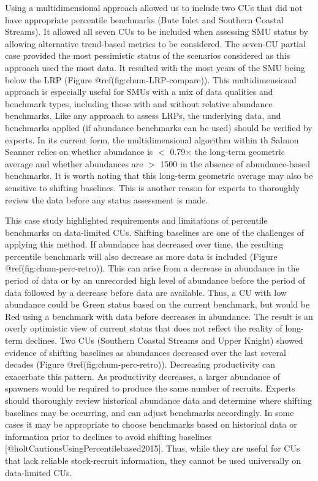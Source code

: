 \documentclass[
]{article}
\begin{document}
Using a multidimensional approach allowed us to include two CUs that did
not have appropriate percentile benchmarks (Bute Inlet and Southern
Coastal Streams). It allowed all seven CUs to be included when assessing
SMU status by allowing alternative trend-based metrics to be considered.
The seven-CU partial case provided the most pessimistic status of the
scenarios considered as this approach used the most data. It resulted
with the most years of the SMU being below the LRP (Figure
@ref(fig:chum-LRP-compare)). This multidimensional approach is
especially useful for SMUs with a mix of data qualities and benchmark
types, including those with and without relative abundance benchmarks.
Like any approach to assess LRPs, the underlying data, and benchmarks
applied (if abundance benchmarks can be used) should be verified by
experts. In its current form, the multidimensional algorithm within th
Salmon Scanner relies on whether abundance is \(<\) 0.79\(\times\) the
long-term geometric average and whether abundances are \(>\) 1500 in the
absence of abundance-based benchmarks. It is worth noting that this
long-term geometric average may also be sensitive to shifting baselines.
This is another reason for experts to thoroughly review the data before
any status assessment is made.

This case study highlighted requirements and limitations of percentile
benchmarks on data-limited CUs. Shifting baselines are one of the
challenges of applying this method. If abundance has decreased over
time, the resulting percentile benchmark will also decrease as more data
is included (Figure @ref(fig:chum-perc-retro)). This can arise from a
decrease in abundance in the period of data or by an unrecorded high
level of abundance before the period of data followed by a decrease
before data are available. Thus, a CU with low abundance could be Green
status based on the current benchmark, but would be Red using a
benchmark with data before decreases in abundance. The result is an
overly optimistic view of current status that does not reflect the
reality of long-term declines. Two CUs (Southern Coastal Streams and
Upper Knight) showed evidence of shifting baselines as abundances
decreased over the last several decades (Figure
@ref(fig:chum-perc-retro)). Decreasing productivity can exacerbate this
pattern. As productivity decreases, a larger abundance of spawners would
be required to produce the same number of recruits. Experts should
thoroughly review historical abundance data and determine where shifting
baselines may be occurring, and can adjust benchmarks accordingly. In
some cases it may be appropriate to choose benchmarks based on
historical data or information prior to declines to avoid shifting
baselines {[}@holtCautionsUsingPercentilebased2015{]}. Thus, while they
are useful for CUs that lack reliable stock-recruit information, they
cannot be used universally on data-limited CUs.
\end{document}
